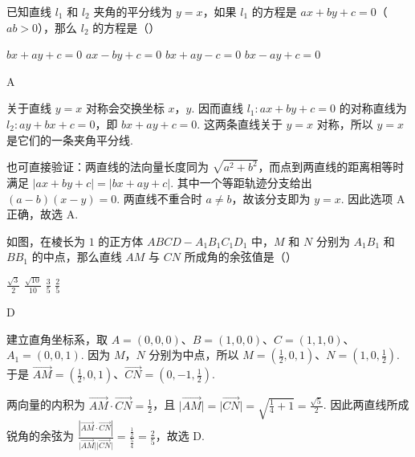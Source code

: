 \begin{problem}
已知直线 \(l_1\) 和 \(l_2\) 夹角的平分线为 \(y=x\)，如果 \(l_1\) 的方程是 \(ax+by+c=0\)（\(ab>0\)），那么 \(l_2\) 的方程是（\quad）

\choices
    {\(bx+ay+c=0\)}
    {\(ax-by+c=0\)}
    {\(bx+ay-c=0\)}
    {\(bx-ay+c=0\)}

\begin{answer}
A
\end{answer}

\begin{solution}
关于直线 \(y=x\) 对称会交换坐标 \(x\)，\(y\). 因而直线 \(l_1:ax+by+c=0\) 的对称直线为
\(l_2:ay+bx+c=0\)，即 \(bx+ay+c=0\). 这两条直线关于 \(y=x\) 对称，所以 \(y=x\) 是它们的一条夹角平分线.

也可直接验证：两直线的法向量长度同为 \(\sqrt{a^2+b^2}\)，而点到两直线的距离相等时满足
\(\left|ax+by+c\right|=\left|bx+ay+c\right|\). 其中一个等距轨迹分支给出
\((a-b)(x-y)=0\). 两直线不重合时 \(a\neq b\)，故该分支即为 \(y=x\). 因此选项 A 正确，故选 A.
\end{solution}
\end{problem}

\begin{problem}
如图，在棱长为 \(1\) 的正方体 \(ABCD-A_1B_1C_1D_1\) 中，\(M\) 和 \(N\) 分别为 \(A_1B_1\) 和 \(BB_1\) 的中点，那么直线 \(AM\) 与 \(CN\) 所成角的余弦值是（\quad）


\choices
    {\(\frac{\sqrt{3}}{2}\)}
    {\(\frac{\sqrt{10}}{10}\)}
    {\(\frac{3}{5}\)}
    {\(\frac{2}{5}\)}

\begin{answer}
D
\end{answer}

\begin{solution}
建立直角坐标系，取 \(A=(0,0,0)\)、\(B=(1,0,0)\)、\(C=(1,1,0)\)、\(A_1=(0,0,1)\). 因为 \(M\)，\(N\) 分别为中点，所以
\(M=\left(\frac12,0,1\right)\)、\(N=\left(1,0,\frac12\right)\). 于是
\(\overrightarrow{AM}=\left(\frac12,0,1\right)\)、\(\overrightarrow{CN}=\left(0,-1,\frac12\right)\).

两向量的内积为 \(\overrightarrow{AM}\cdot\overrightarrow{CN}=\frac12\)，且
\(\lvert\overrightarrow{AM}\rvert=\lvert\overrightarrow{CN}\rvert=\sqrt{\frac14+1}=\frac{\sqrt5}{2}\). 因此两直线所成锐角的余弦为
\(\frac{\left|\overrightarrow{AM}\cdot\overrightarrow{CN}\right|}{\lvert\overrightarrow{AM}\rvert\lvert\overrightarrow{CN}\rvert}=\frac{\frac12}{\frac54}=\frac25\)，故选 D.
\end{solution}
\end{problem}

